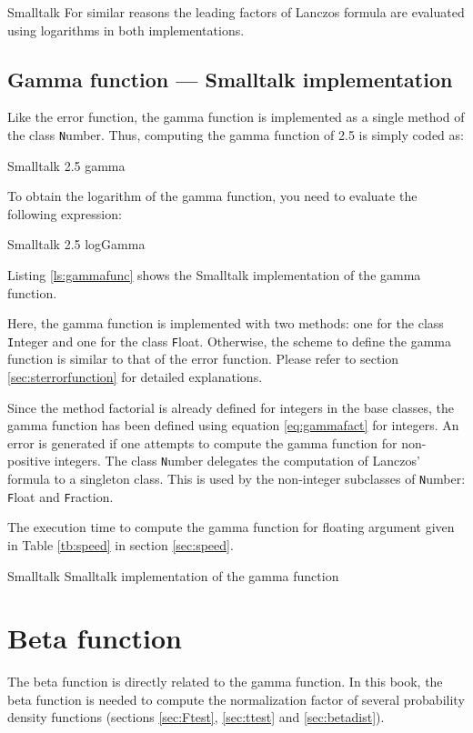 \begin{listing}{Smalltalk}
For similar reasons the leading factors of Lanczos formula are
evaluated using logarithms in both implementations.

\subsection{Gamma function --- Smalltalk implementation}
 Like the error function, the gamma
function is implemented as a single method of the class {\texttt
Number}. Thus, computing the gamma function of 2.5 is simply coded
as:
\begin{listing}{Smalltalk}
2.5 gamma
\end{listing}
To obtain the logarithm of the gamma function, you need to
evaluate the following expression:
\begin{listing}{Smalltalk}
2.5 logGamma
\end{listing}

Listing \ref{ls:gammafunc} shows the Smalltalk implementation of the gamma
function.

Here, the gamma function is implemented with two methods: one for
the class {\texttt Integer} and one for the class {\texttt Float}.
Otherwise, the scheme to define the gamma function is similar to
that of the error function. Please refer to section
\ref{sec:sterrorfunction} for detailed explanations.

Since the method factorial is already defined for integers in the
base classes, the gamma function has been defined using equation
\ref{eq:gammafact} for integers. An error is generated if one
attempts to compute the gamma function for non-positive integers.
The class {\texttt Number} delegates the computation of Lanczos'
formula to a singleton class. This is used by the non-integer
subclasses of {\texttt Number}: {\texttt Float} and {\texttt Fraction}.

The execution time to compute the gamma function for floating
argument given in Table \ref{tb:speed} in section \ref{sec:speed}.
\begin{listing}[label=ls:gammafunc]{Smalltalk}
{Smalltalk implementation of the gamma function}



\end{listing}

\section{Beta function}
\label{sec:betafunc} The beta function is directly related to the
gamma function. In this book, the beta function is needed to
compute the normalization factor of several probability density
functions (\cf sections \ref{sec:Ftest}, \ref{sec:ttest} and
\ref{sec:betadist}).

\end{listing}
